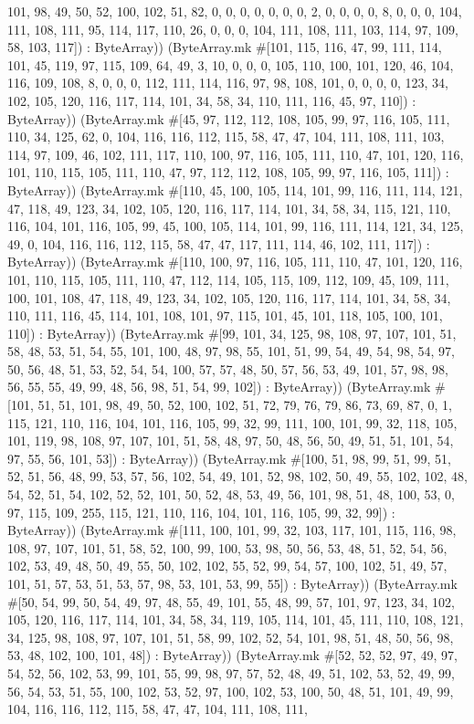 \documentclass[11pt]{article}
\begin{document}
101, 98, 49, 50, 52, 100, 102, 51, 82, 0, 0, 0, 0, 0, 0, 0, 2, 0, 0, 0, 0, 8, 0, 0, 0, 104, 111, 108, 111, 95, 114, 117, 110, 26, 0, 0, 0, 104, 111, 108, 111, 103, 114, 97, 109, 58, 103, 117]) : ByteArray)) (ByteArray.mk \#[101, 115, 116, 47, 99, 111, 114, 101, 45, 119, 97, 115, 109, 64, 49, 3, 10, 0, 0, 0, 105, 110, 100, 101, 120, 46, 104, 116, 109, 108, 8, 0, 0, 0, 112, 111, 114, 116, 97, 98, 108, 101, 0, 0, 0, 0, 123, 34, 102, 105, 120, 116, 117, 114, 101, 34, 58, 34, 110, 111, 116, 45, 97, 110]) : ByteArray)) (ByteArray.mk \#[45, 97, 112, 112, 108, 105, 99, 97, 116, 105, 111, 110, 34, 125, 62, 0, 104, 116, 116, 112, 115, 58, 47, 47, 104, 111, 108, 111, 103, 114, 97, 109, 46, 102, 111, 117, 110, 100, 97, 116, 105, 111, 110, 47, 101, 120, 116, 101, 110, 115, 105, 111, 110, 47, 97, 112, 112, 108, 105, 99, 97, 116, 105, 111]) : ByteArray)) (ByteArray.mk \#[110, 45, 100, 105, 114, 101, 99, 116, 111, 114, 121, 47, 118, 49, 123, 34, 102, 105, 120, 116, 117, 114, 101, 34, 58, 34, 115, 121, 110, 116, 104, 101, 116, 105, 99, 45, 100, 105, 114, 101, 99, 116, 111, 114, 121, 34, 125, 49, 0, 104, 116, 116, 112, 115, 58, 47, 47, 117, 111, 114, 46, 102, 111, 117]) : ByteArray)) (ByteArray.mk \#[110, 100, 97, 116, 105, 111, 110, 47, 101, 120, 116, 101, 110, 115, 105, 111, 110, 47, 112, 114, 105, 115, 109, 112, 109, 45, 109, 111, 100, 101, 108, 47, 118, 49, 123, 34, 102, 105, 120, 116, 117, 114, 101, 34, 58, 34, 110, 111, 116, 45, 114, 101, 108, 101, 97, 115, 101, 45, 101, 118, 105, 100, 101, 110]) : ByteArray)) (ByteArray.mk \#[99, 101, 34, 125, 98, 108, 97, 107, 101, 51, 58, 48, 53, 51, 54, 55, 101, 100, 48, 97, 98, 55, 101, 51, 99, 54, 49, 54, 98, 54, 97, 50, 56, 48, 51, 53, 52, 54, 54, 100, 57, 57, 48, 50, 57, 56, 53, 49, 101, 57, 98, 98, 56, 55, 55, 49, 99, 48, 56, 98, 51, 54, 99, 102]) : ByteArray)) (ByteArray.mk \#[101, 51, 51, 101, 98, 49, 50, 52, 100, 102, 51, 72, 79, 76, 79, 86, 73, 69, 87, 0, 1, 115, 121, 110, 116, 104, 101, 116, 105, 99, 32, 99, 111, 100, 101, 99, 32, 118, 105, 101, 119, 98, 108, 97, 107, 101, 51, 58, 48, 97, 50, 48, 56, 50, 49, 51, 51, 101, 54, 97, 55, 56, 101, 53]) : ByteArray)) (ByteArray.mk \#[100, 51, 98, 99, 51, 99, 51, 52, 51, 56, 48, 99, 53, 57, 56, 102, 54, 49, 101, 52, 98, 102, 50, 49, 55, 102, 102, 48, 54, 52, 51, 54, 102, 52, 52, 101, 50, 52, 48, 53, 49, 56, 101, 98, 51, 48, 100, 53, 0, 97, 115, 109, 255, 115, 121, 110, 116, 104, 101, 116, 105, 99, 32, 99]) : ByteArray)) (ByteArray.mk \#[111, 100, 101, 99, 32, 103, 117, 101, 115, 116, 98, 108, 97, 107, 101, 51, 58, 52, 100, 99, 100, 53, 98, 50, 56, 53, 48, 51, 52, 54, 56, 102, 53, 49, 48, 50, 49, 55, 50, 102, 102, 55, 52, 99, 54, 57, 100, 102, 51, 49, 57, 101, 51, 57, 53, 51, 53, 57, 98, 53, 101, 53, 99, 55]) : ByteArray)) (ByteArray.mk \#[50, 54, 99, 50, 54, 49, 97, 48, 55, 49, 101, 55, 48, 99, 57, 101, 97, 123, 34, 102, 105, 120, 116, 117, 114, 101, 34, 58, 34, 119, 105, 114, 101, 45, 111, 110, 108, 121, 34, 125, 98, 108, 97, 107, 101, 51, 58, 99, 102, 52, 54, 101, 98, 51, 48, 50, 56, 98, 53, 48, 102, 100, 101, 48]) : ByteArray)) (ByteArray.mk \#[52, 52, 52, 97, 49, 97, 54, 52, 56, 102, 53, 99, 101, 55, 99, 98, 97, 57, 52, 48, 49, 51, 102, 53, 52, 49, 99, 56, 54, 53, 51, 55, 100, 102, 53, 52, 97, 100, 102, 53, 100, 50, 48, 51, 101, 49, 99, 104, 116, 116, 112, 115, 58, 47, 47, 104, 111, 108, 111, 
\end{document}
